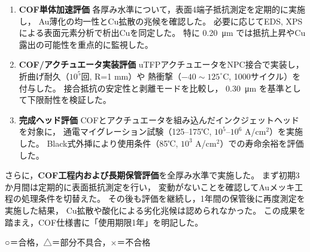\documentclass[conference]{IEEEtran}
\begin{document}
\begin{enumerate}
  \item \textbf{COF単体加速評価}  
        各厚み水準について，表面4端子抵抗測定を定期的に実施し，
        Au薄化の均一性とCu拡散の兆候を確認した。  
        必要に応じてEDS, XPSによる表面元素分析で析出Cuを同定した。  
        特に \SI{0.20}{\micro\meter} では抵抗上昇やCu露出の可能性を重点的に監視した。
  \item \textbf{COF/アクチュエータ実装評価}  
        uTFPアクチュエータをNPC接合で実装し，折曲げ耐久（$10^5$回, R=1 mm）や
        熱衝撃（$-40\sim125^\circ$C, 1000サイクル）を付与した。  
        接合抵抗の安定性と剥離モードを比較し，
        \SI{0.30}{\micro\meter} を基準として下限耐性を検証した。
  \item \textbf{完成ヘッド評価}  
        COFとアクチュエータを組み込んだインクジェットヘッドを対象に，
        通電マイグレーション試験（125--175℃, $10^5$--$10^6$ A/cm$^2$）を実施した。  
        Black式外挿により使用条件（85℃, $10^3$ A/cm$^2$）での寿命余裕を評価した。
\end{enumerate}

さらに，\textbf{COF工程内および長期保管評価}を全厚み水準で実施した。  
まず初期3か月間は定期的に表面抵抗測定を行い，
変動がないことを確認してAuメッキ工程の処理条件を切替えた。  
その後も評価を継続し，1年間の保管後に再度測定を実施した結果，
Cu拡散や酸化による劣化兆候は認められなかった。  
この成果を踏まえ，COF仕様書に「使用期限1年」を明記した。

\begin{table}[htbp]
  \centering
  \caption{評価試験マトリクス（Evaluation test matrix）}
  \label{tab:test-matrix}
  \vspace{2pt}
  \footnotesize{○＝合格，△＝部分不具合，×＝不合格}
\end{table}
\end{document}
